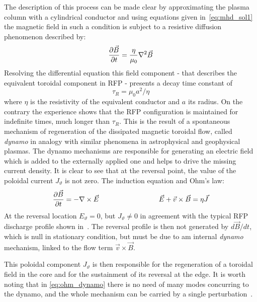 The description of this process can be made clear by approximating the plasma column with a cylindrical conductor and using equations given in~\eqref{eq:mhd_sol1} the magnetic field in such a condition is subject to a resistive diffusion phenomenon described by:
\begin{equation}
    \pdv{\Vec{B}}{t} = \frac{\eta}{\mu_0} \nabla^2 \Vec{B}
\end{equation}
Resolving the differential equation this field component - that describes the equivalent toroidal component in RFP - presents a decay time constant of $$\tau_R = \mu_0 a^2 / \eta$$ 
where $\eta$ is the resistivity of the equivalent conductor and $a$ its radius.
On the contrary the experience shows that the RFP configuration is maintained for indefinite times, much longer than $\tau_R$. This is the result of a spontaneous mechanism of regeneration of the dissipated magnetic toroidal flow, called \textit{dynamo} in analogy with similar phenomena in astrophysical and geophysical plasmas. The dynamo mechanisms are responsible for generating an electric field which is added to the externally applied one and helps to drive the missing current density. 
It is clear to see that at the reversal point, the value of the poloidal current $J_\vartheta$ is not zero. The induction equation and Ohm’s law:
\begin{equation*}
    \pdv{\Vec{B}}{t} = - \nabla \times \Vec{E}  \hspace{3cm} \Vec{E} + \Vec{v} \times \Vec{B} = \eta \Vec{J}
    \label{eq:ohm_dynamo}
\end{equation*}
At the reversal location $E_\vartheta = 0$, 
but $J_\vartheta \neq 0$ in agreement with the typical RFP discharge profile shown  in~\Figure{\ref{fig:intro_safety_factor_profiles}}.
The reversal profile is then not generated by $d\Vec{B}/dt$, which is null in stationary condition, but must be due to am internal \textit{dynamo} mechanism, linked to the flow term $\Vec{v} \times \Vec{B}$.

This poloidal component $J_\vartheta$ is then responsible for the regeneration of a toroidal field in the core and for the sustainment of its reversal at the edge. It is worth noting that in \eqref{eq:ohm_dynamo} there is no need of many modes concurring to the dynamo, and the whole mechanism can be carried by a single perturbation~\cite{Bonomo39}.

